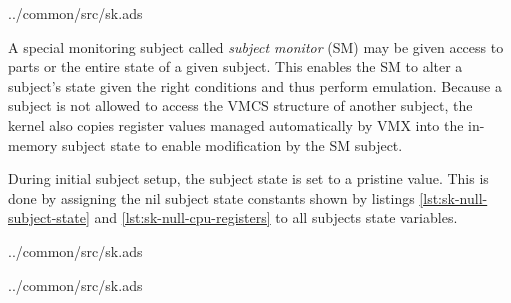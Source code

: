 
	{../common/src/sk.ads}

A special monitoring subject called \emph{subject monitor} (SM) may be given access to parts or the entire state of a
given subject. This enables the SM to alter a subject's state given the right
conditions and thus perform emulation. Because a subject is not allowed to
access the VMCS structure of another subject, the kernel also copies register
values managed automatically by VMX into the in-memory subject state
to enable modification by the SM subject.

During initial subject setup, the subject state is set to a pristine value. This
is done by assigning the nil subject state constants shown by listings
\ref{lst:sk-null-subject-state} and \ref{lst:sk-null-cpu-registers} to all
subjects state variables.


	{../common/src/sk.ads}


	{../common/src/sk.ads}
